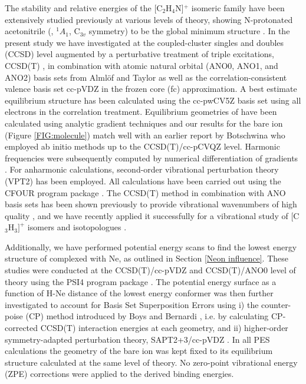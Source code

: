 The stability and relative energies of the [C$_2$H$_4$N]$^+$ isomeric family have been extensively studied previously at various levels of theory, showing N-protonated acetonitrile (\pa, $^1A_1$, C$_{3v}$ symmetry) to be the global minimum structure \cite{wuerthwein_1984, Cerqueira2020}.
In the present study we have investigated \pa at the coupled-cluster singles and doubles (CCSD) level augmented by a perturbative treatment of triple excitations, CCSD(T)  \cite{raghavachari_chemphyslett_157_479_1989}, in combination with atomic natural orbital (ANO0, ANO1, and ANO2) basis sets from Alml\"of and Taylor \cite{almlof_JCP_86_4070_1987} as well as the
correlation-consistent valence basis set cc-pVDZ \cite{dunning_gaussian_1989}
in the frozen core (fc) approximation. A best estimate equilibrium structure has been calculated using the cc-pwCV5Z basis set \cite{peterson_JCP_117_10548_2002} using all electrons in the correlation treatment.
Equilibrium geometries of \pa have been calculated using analytic gradient techniques  \cite{watts_chemphyslett_200_1-2_1_1992} and our results for the bare ion (Figure \ref{FIG:molecule}) match well with an earlier report by Botschwina \cite{Botschwina2000} who employed ab initio methods up to the CCSD(T)/cc-pCVQZ level. Harmonic frequencies were subsequently computed by numerical differentiation of
gradients \cite{lee_analytic_1991,watts_coupledcluster_1993}.
For anharmonic calculations, second-order vibrational perturbation theory (VPT2) \cite{mills_alphas} has been employed. All calculations have been carried out using the CFOUR program package  \cite{cfour_JCP_2020,harding_parallel_2008}. The CCSD(T) method in combination with ANO basis sets has been shown previously to provide vibrational wavenumbers of high quality  \cite{mccaslin_MolPhys_111_1492_2013,thorwirth_JMS_251_220_2008}, and we have recently applied it successfully for a vibrational study of [C$_3$H$_3]^+$ isomers and isotopologues \cite{Marimuthu2020LaboratorySpectroscopy}.

Additionally, we have performed potential energy scans to find the lowest energy structure of \pa complexed with Ne, as outlined in Section \ref{Neon influence}. These studies were conducted at the CCSD(T)/cc-pVDZ and CCSD(T)/ANO0 level of theory using the PSI4 program package \cite{PBL2017}. The potential energy surface as a function of H-Ne distance of the lowest energy conformer was then further investigated to account for Basis Set Superposition Errors \cite{liu_accurate_1973} using i) the counter-poise (CP) method introduced by Boys and Bernardi \cite{boys_calculation_1970}, i.e. by calculating CP-corrected CCSD(T) interaction energies at each geometry, and ii) higher-order symmetry-adapted perturbation theory, SAPT2+3/cc-pVDZ  \cite{jeziorski_perturbation_1994, hohenstein_density_2010}. In all PES calculations the geometry of the bare ion was kept fixed to its equilibrium structure calculated at the same level of theory. No zero-point vibrational energy (ZPE) corrections were applied to the derived binding energies.

